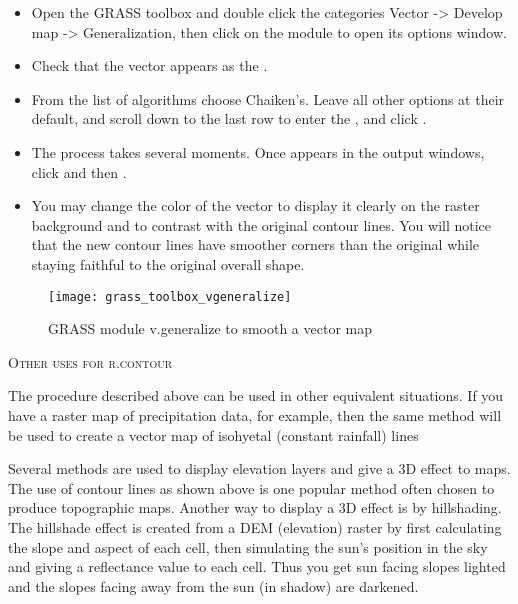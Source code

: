 \begin{itemize}[label=--]
\item Open the GRASS toolbox and double click the categories Vector ->
Develop map -> Generalization, then click on the 
module to open its options window. 
\item Check that the  vector appears as the
. 
\item From the list of algorithms choose Chaiken's. Leave all other options
at their default, and scroll down to the last row to enter the
, and click
.
\item The process takes several moments. Once  appears in the output windows, click  and then
. 
\item You may change the color of the vector to display it clearly on the
raster background and to contrast with the original contour lines. You will
notice that the new contour lines have smoother corners than the original
while staying faithful to the original overall shape.
\end{itemize}

\begin{figure}[h]
 \centering
 \texttt{[image: grass\_toolbox\_vgeneralize]}
 \caption{GRASS module v.generalize to smooth a vector map \nixcaption}\label{fig:grass_toolbox_vgeneralize}
\end{figure}

\begin{Tip}\caption{\textsc{Other uses for r.contour}}
The procedure described above can be used in other equivalent
situations. If you have a raster map of precipitation data, for example, then
the same method will be used to create a vector map of isohyetal (constant
rainfall) lines 
\end{Tip}  


Several methods are used to display elevation layers and give a 3D effect to
maps. The use of contour lines as shown above is one popular method often
chosen to produce topographic maps. Another way to display a 3D effect is by
hillshading. The hillshade effect is created from a DEM (elevation) raster by
first calculating the slope and aspect of each cell, then simulating the
sun's position in the sky and giving a reflectance value to each cell. Thus
you get sun facing slopes lighted and the slopes facing away from the sun (in
shadow) are darkened.

